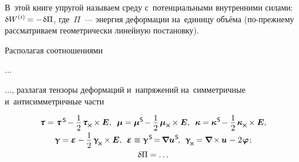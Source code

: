 \begin{otherlanguage}{russian}

В~этой книге упругой называем среду с~потенциальными внутренними силами: ${\variation{\internalwork} = - \hspace{.16ex} \variation{\Pi}}$, где~$\Pi$~--- энергия деформации на~единицу объёма (по\hbox{-}прежнему рассматриваем геометрически линейную постановку).

Располагая соотношениями

...

..., разлагая тензоры деформаций и~напряжений на~симметричные и~антисимметричные части

\nopagebreak\begin{equation}
\begin{array}{c}
\forcestresstensor = \forcestresstensor^{\hspace{.32ex}\mathsf{S}} \hspace{-0.25ex} - \displaystyle \onehalf \hspace{.2ex} \forcestresstensor_{\hspace{-0.1ex}\Xcompanion} \hspace{-0.1ex} \times \bm{E} , \;\:
%
\couplestresstensor = \couplestresstensor^{\mathsf{S}} \hspace{-0.25ex} - \displaystyle \onehalf \hspace{.32ex} \couplestresstensor_{\Xcompanion} \hspace{-0.1ex} \times \bm{E} , \;\:
%
\wrynesstensor = \wrynesstensor^{\hspace{.12ex}\mathsf{S}} \hspace{-0.25ex} - \displaystyle \onehalf \hspace{.32ex} \wrynesstensor_{\Xcompanion} \hspace{-0.1ex} \times \bm{E} ,
\\[.6em]
%
\distortiontensor = \mathboldepsilon - \displaystyle \onehalf \hspace{.32ex} \distortiontensor_{\hspace{-0.25ex}\Xcompanion} \hspace{-0.1ex} \times \bm{E} , \:\:
%
\mathboldepsilon \equiv \distortiontensor^{\hspace{.2ex}\mathsf{S}} \hspace{-0.32ex} = \hspace{-0.2ex} \boldnabla {\fieldofdisplacements}^{\hspace{0.1ex}\mathsf{S}} \hspace{-0.25ex} , \:\:
%
\distortiontensor_{\hspace{-0.25ex}\Xcompanion} \hspace{-0.16ex}
= \boldnabla \hspace{-0.16ex} \times \hspace{-0.1ex} \fieldofdisplacements \hspace{.12ex} - \hspace{.12ex} 2 \hspace{.16ex} \fieldofrotations \hspace{.16ex} ;
\\[.6em]
%
\variation{\Pi} = \ldots
\end{array}
\end{equation}


\end{otherlanguage}
